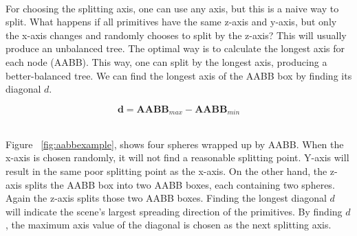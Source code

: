 \documentclass[11pt,a4paper]{article}
\begin{document}
\noindent
\\
For choosing the splitting axis, one can use any axis, but this is a naive way to split. What happens if all primitives have the same z-axis and y-axis, but only the x-axis changes and randomly chooses to split by the z-axis? This will usually produce an unbalanced tree. The optimal way is to calculate the longest axis for each node (AABB). This way, one can split by the longest axis, producing a better-balanced tree. We can find the longest axis of the AABB box by finding its diagonal $d$. 


\begin{equation}
\textbf{d} = \textbf{AABB}_{max} - \textbf{AABB}_{min}
\end{equation}

\noindent
\\
Figure ~\ref{fig:aabbexample}, shows four spheres wrapped up by AABB. When the x-axis is chosen randomly, it will not find a reasonable splitting point. Y-axis will result in the same poor splitting point as the x-axis. On the other hand, the z-axis splits the AABB box into two AABB boxes, each containing two spheres. Again the z-axis splits those two AABB boxes. Finding the longest diagonal $d$ will indicate the scene's largest spreading direction of the primitives. By finding $d$, the maximum axis value of the diagonal is chosen as the next splitting axis.
\end{document}
